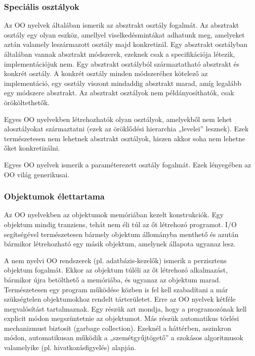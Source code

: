\subsubsection{Speciális osztályok}
Az OO nyelvek általában ismerik az absztrakt osztály fogalmát. Az absztrakt osztály egy olyan eszköz, amellyel viselkedésmintákat adhatunk meg, amelyeket aztán valamely leszármazott osztály majd konkretizál. Egy absztrakt osztályban általában vannak absztrakt módszerek, ezeknek csak a specifikációja létezik, implementációjuk nem. Egy absztrakt osztályból származtatható absztrakt és konkrét osztály. A konkrét osztály minden módszeréhez kötelező az implementáció, egy osztály viszont mindaddig absztrakt marad, amíg legalább egy módszere absztrakt. Az absztrakt osztályok nem példányosíthatók, csak örököltethetők.

Egyes OO nyelvekben létrehozhatók olyan osztályok, amelyekből nem lehet alosztályokat származtatni (ezek az öröklődési hierarchia „levelei” lesznek). Ezek természetesen nem lehetnek absztrakt osztályok, hiszen akkor soha nem lehetne őket konkretizálni.

Egyes OO nyelvek ismerik a paraméterezett osztály fogalmát. Ezek lényegében az OO világ generikusai.

\subsubsection{Objektumok élettartama}
Az OO nyelvekben az objektumok memóriában kezelt konstrukciók. Egy objektum mindig tranziens, tehát nem éli túl az őt létrehozó programot. I/O segítségével természetesen bármely objektum állományba menthető és azután bármikor létrehozható egy másik objektum, amelynek állapota ugyanaz lesz.

A nem nyelvi OO rendszerek (pl. adatbázis-kezelők) ismerik a perzisztens objektum fogalmát. Ekkor az objektum túléli az őt létrehozó alkalmazást, bármikor újra betölthető a memóriába, és ugyanaz az objektum marad. Természetesen egy program működése közben is fel kell szabadítani a már szükségtelen objektumokhoz rendelt tárterületet. Erre az OO nyelvek kétféle megvalósítást tartalmaznak. Egy részük azt mondja, hogy a programozónak kell explicit módon megszüntetnie az objektumot. Más részük automatikus törlési mechanizmust biztosít (garbage collection). Ezeknél a háttérben, aszinkron módon, automatikusan működik a „szemétgyűjtögető” a szokásos algoritmusok valamelyike (pl. hivatkozásfigyelés) alapján. 

